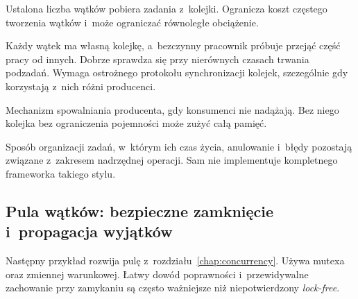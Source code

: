 \begin{description}[style=nextline]
\item[\emph{Thread pool}]
  Ustalona liczba wątków pobiera zadania z~kolejki. Ogranicza koszt
  częstego tworzenia wątków i~może ograniczać równoległe obciążenie.
\item[\emph{Work stealing}]
  Każdy wątek ma własną kolejkę, a~bezczynny pracownik próbuje
  przejąć część pracy od innych. Dobrze sprawdza się przy nierównych
  czasach trwania podzadań. Wymaga ostrożnego protokołu synchronizacji
  kolejek, szczególnie gdy korzystają z~nich różni producenci.
\item[\emph{Backpressure}]
  Mechanizm spowalniania producenta, gdy konsumenci nie nadążają.
  Bez niego kolejka bez ograniczenia pojemności może zużyć całą pamięć.
\item[\emph{Structured concurrency}]
  Sposób organizacji zadań, w~którym ich czas życia, anulowanie i~błędy
  pozostają związane z~zakresem nadrzędnej operacji. Sam 
  nie implementuje kompletnego frameworka takiego stylu.
\end{description}

\subsection{Pula wątków: bezpieczne zamknięcie i~propagacja wyjątków}

Następny przykład rozwija pulę z~rozdziału~\ref{chap:concurrency}. Używa mutexa
oraz zmiennej warunkowej. Łatwy dowód poprawności i~przewidywalne
zachowanie przy zamykaniu są często ważniejsze niż
niepotwierdzony \emph{lock-free}.

